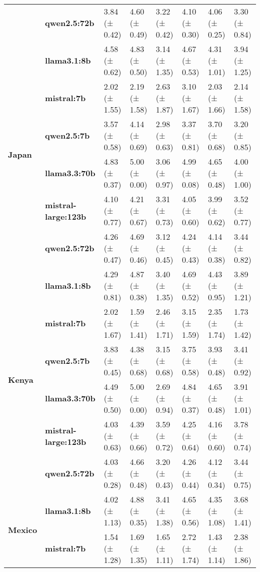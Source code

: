 \begin{longtable}{llllllll}
\textbf{} & \textbf{qwen2.5:72b} & 3.84 (± 0.42) & 4.60 (± 0.49) & 3.22 (± 0.42) & 4.10 (± 0.30) & 4.06 (± 0.25) & 3.30 (± 0.84) \\
\cline{1-8}
\multirow[t]{6}{*}{\textbf{Japan}} & \textbf{llama3.1:8b} & 4.58 (± 0.62) & 4.83 (± 0.50) & 3.14 (± 1.35) & 4.67 (± 0.53) & 4.31 (± 1.01) & 3.94 (± 1.25) \\
\textbf{} & \textbf{mistral:7b} & 2.02 (± 1.55) & 2.19 (± 1.58) & 2.63 (± 1.87) & 3.10 (± 1.67) & 2.03 (± 1.66) & 2.14 (± 1.58) \\
\textbf{} & \textbf{qwen2.5:7b} & 3.57 (± 0.58) & 4.14 (± 0.69) & 2.98 (± 0.63) & 3.37 (± 0.81) & 3.70 (± 0.68) & 3.20 (± 0.85) \\
\textbf{} & \textbf{llama3.3:70b} & 4.83 (± 0.37) & 5.00 (± 0.00) & 3.06 (± 0.97) & 4.99 (± 0.08) & 4.65 (± 0.48) & 4.00 (± 1.00) \\
\textbf{} & \textbf{mistral-large:123b} & 4.10 (± 0.77) & 4.21 (± 0.67) & 3.31 (± 0.73) & 4.05 (± 0.60) & 3.99 (± 0.62) & 3.52 (± 0.77) \\
\textbf{} & \textbf{qwen2.5:72b} & 4.26 (± 0.47) & 4.69 (± 0.46) & 3.12 (± 0.45) & 4.24 (± 0.43) & 4.14 (± 0.38) & 3.44 (± 0.82) \\
\cline{1-8}
\multirow[t]{6}{*}{\textbf{Kenya}} & \textbf{llama3.1:8b} & 4.29 (± 0.81) & 4.87 (± 0.38) & 3.40 (± 1.35) & 4.69 (± 0.52) & 4.43 (± 0.95) & 3.89 (± 1.21) \\
\textbf{} & \textbf{mistral:7b} & 2.02 (± 1.67) & 1.59 (± 1.41) & 2.46 (± 1.71) & 3.15 (± 1.59) & 2.35 (± 1.74) & 1.73 (± 1.42) \\
\textbf{} & \textbf{qwen2.5:7b} & 3.83 (± 0.45) & 4.38 (± 0.68) & 3.15 (± 0.68) & 3.75 (± 0.58) & 3.93 (± 0.48) & 3.41 (± 0.92) \\
\textbf{} & \textbf{llama3.3:70b} & 4.49 (± 0.50) & 5.00 (± 0.00) & 2.69 (± 0.94) & 4.84 (± 0.37) & 4.65 (± 0.48) & 3.91 (± 1.01) \\
\textbf{} & \textbf{mistral-large:123b} & 4.03 (± 0.63) & 4.39 (± 0.66) & 3.59 (± 0.72) & 4.25 (± 0.64) & 4.16 (± 0.60) & 3.78 (± 0.74) \\
\textbf{} & \textbf{qwen2.5:72b} & 4.03 (± 0.28) & 4.66 (± 0.48) & 3.20 (± 0.43) & 4.26 (± 0.44) & 4.12 (± 0.34) & 3.44 (± 0.75) \\
\cline{1-8}
\multirow[t]{6}{*}{\textbf{Mexico}} & \textbf{llama3.1:8b} & 4.02 (± 1.13) & 4.88 (± 0.35) & 3.41 (± 1.38) & 4.65 (± 0.56) & 4.35 (± 1.08) & 3.68 (± 1.41) \\
\textbf{} & \textbf{mistral:7b} & 1.54 (± 1.28) & 1.69 (± 1.35) & 1.65 (± 1.11) & 2.72 (± 1.74) & 1.43 (± 1.14) & 2.38 (± 1.86) \\

\end{longtable}
